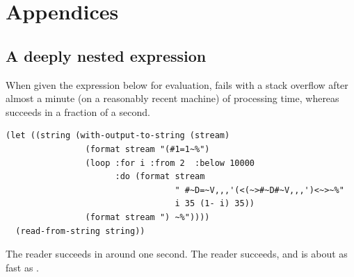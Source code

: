 \section{Appendices}

\subsection{A deeply nested expression}
\label{app-nesting}

When given the expression below for evaluation, \sbcl{} fails with a
stack overflow after almost a minute (on a reasonably recent machine)
of processing time, whereas \eclector{} succeeds in a fraction of a
second.

\begin{listing}[H]
\begin{verbatim}
(let ((string (with-output-to-string (stream)
                (format stream "(#1=1~%")
                (loop :for i :from 2  :below 10000
                      :do (format stream
                                  " #~D=~V,,,'(<(~>#~D#~V,,,')<~>~%"
                                  i 35 (1- i) 35))
                (format stream ") ~%"))))
  (read-from-string string))
\end{verbatim}
\end{listing}

\noindent
The \ecl{} reader succeeds in around one second.  The \ccl{} reader
succeeds, and is about as fast as \eclector{}.

